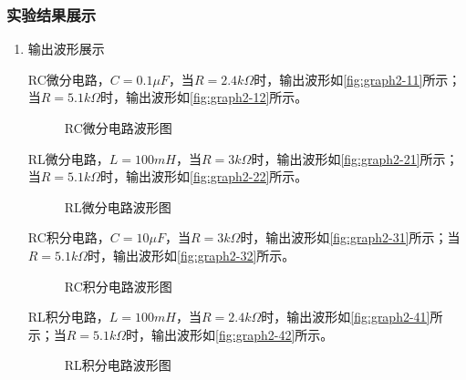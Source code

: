 \documentclass[dvipsnames, svgnames,a4paper,11pt]{article}
\begin{document}
	\subsubsection{实验结果展示}
	\begin{enumerate}
		\item 输出波形展示
		
		RC微分电路，$C=0.1\mu F$，当$R=2.4k\Omega$时，输出波形如\cref{fig:graph2-11}所示；当$R=5.1k\Omega$时，输出波形如\cref{fig:graph2-12}所示。

		\begin{figure}[htbp]
			\centering
			\quad
			\quad
			\caption{RC微分电路波形图}
			\label{fig:graph2-1}
		\end{figure}

		RL微分电路，$L=100mH$，当$R=3k\Omega$时，输出波形如\cref{fig:graph2-21}所示；当$R=5.1k\Omega$时，输出波形如\cref{fig:graph2-22}所示。

		\begin{figure}[htbp]
			\centering
			\quad
			\quad
			\caption{RL微分电路波形图}
			\label{fig:graph2-2}
		\end{figure}

		RC积分电路，$C=10\mu F$，当$R=3k\Omega$时，输出波形如\cref{fig:graph2-31}所示；当$R=5.1k\Omega$时，输出波形如\cref{fig:graph2-32}所示。

		\begin{figure}[htbp]
			\centering
			\quad
			\quad
			\caption{RC积分电路波形图}
			\label{fig:graph2-3}
		\end{figure}
		
		RL积分电路，$L=100mH$，当$R=2.4k\Omega$时，输出波形如\cref{fig:graph2-41}所示；当$R=5.1k\Omega$时，输出波形如\cref{fig:graph2-42}所示。

		\begin{figure}[htbp]
			\centering
			\quad
			\quad
			\caption{RL积分电路波形图}
			\label{fig:graph2-4}
		\end{figure}


\end{enumerate}
\end{document}
